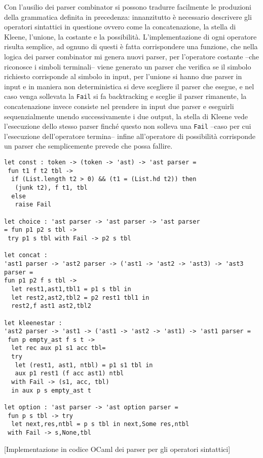 \documentclass[]{article}
\begin{document}
Con l'ausilio dei parser combinator si possono tradurre facilmente le
produzioni della grammatica definita in precedenza: innanzitutto è
necessario descrivere gli operatori sintattici in questione ovvero come
la concatenazione, la stella di Kleene, l'unione, la costante e la
possibilità. L'implementazione di ogni operatore risulta semplice, ad
ognuno di questi è fatta corrispondere una funzione, che nella logica
dei parser combinator mi genera nuovi parser, per l'operatore costante
--che riconosce i simboli terminali-- viene generato un parser che
verifica se il simbolo richiesto corrisponde al simbolo in input, per
l'unione si hanno due parser in input e in maniera non deterministica si
deve scegliere il parser che esegue, e nel caso venga sollevata la
\texttt{Fail} si fa backtracking e sceglie il parser rimanente, la
concatenazione invece consiste nel prendere in input due parser e
eseguirli sequenzialmente unendo successivamente i due output, la stella
di Kleene vede l'esecuzione dello stesso parser finché questo non
solleva una \texttt{Fail} --caso per cui l'esecuzione dell'operatore
termina-- infine all'operatore di possibilità corrisponde un parser che
semplicemente prevede che possa fallire.

\begin{verbatim}
let const : token -> (token -> 'ast) -> 'ast parser =
 fun t1 f t2 tbl ->
  if (List.length t2 > 0) && (t1 = (List.hd t2)) then
   (junk t2), f t1, tbl
  else
   raise Fail

let choice : 'ast parser -> 'ast parser -> 'ast parser
= fun p1 p2 s tbl ->
 try p1 s tbl with Fail -> p2 s tbl

let concat : 
'ast1 parser -> 'ast2 parser -> ('ast1 -> 'ast2 -> 'ast3) -> 'ast3 parser = 
fun p1 p2 f s tbl ->
  let rest1,ast1,tbl1 = p1 s tbl in
  let rest2,ast2,tbl2 = p2 rest1 tbl1 in
  rest2,f ast1 ast2,tbl2

let kleenestar : 
'ast2 parser -> 'ast1 -> ('ast1 -> 'ast2 -> 'ast1) -> 'ast1 parser =
 fun p empty_ast f s t ->
  let rec aux p1 s1 acc tbl=
  try
   let (rest1, ast1, ntbl) = p1 s1 tbl in
   aux p1 rest1 (f acc ast1) ntbl
  with Fail -> (s1, acc, tbl)
  in aux p s empty_ast t

let option : 'ast parser -> 'ast option parser =
 fun p s tbl -> try
  let next,res,ntbl = p s tbl in next,Some res,ntbl
 with Fail -> s,None,tbl
\end{verbatim}

{[}Implementazione in codice OCaml dei parser per gli operatori
sintattici{]}
\end{document}
